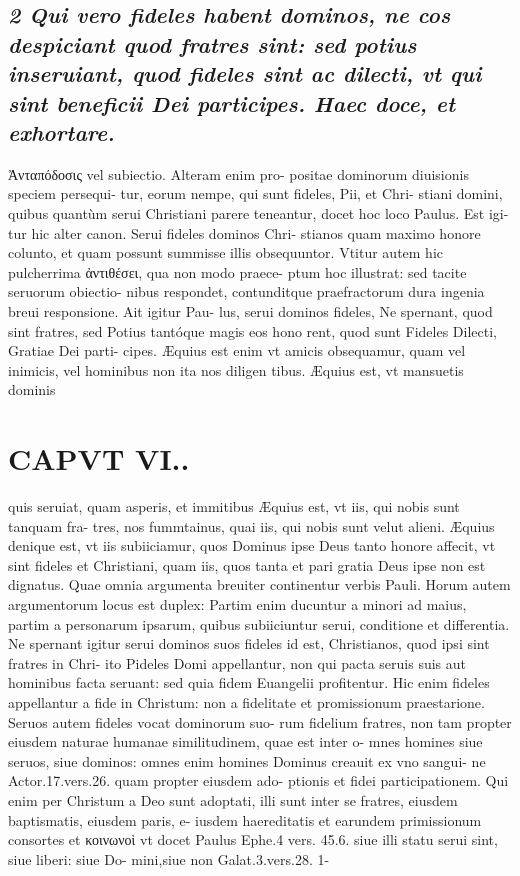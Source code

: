 \documentclass{article}
\begin{document}
\begin{pages}
\subsection*{\textit{2 Qui vero fideles habent dominos, ne cos despiciant quod fratres sint: sed potius inseruiant, quod fideles sint ac dilecti, vt qui sint beneficii Dei participes. Haec doce, et exhortare. }}\pstart Ἀνταπόδοσις vel subiectio. Alteram enim pro- positae dominorum diuisionis speciem persequi- tur, eorum nempe, qui sunt fideles, Pii, et Chri- stiani domini, quibus quantùm serui Christiani parere teneantur, docet hoc loco Paulus. Est igi- tur hic alter canon. Serui fideles dominos Chri- stianos quam maximo honore colunto, et quam possunt summisse illis obsequuntor. Vtitur autem hic pulcherrima ἀντιθέσει, qua non modo praece- ptum hoc illustrat: sed tacite seruorum obiectio- nibus respondet, contunditque praefractorum dura ingenia breui responsione. Ait igitur Pau- lus, serui dominos fideles, Ne spernant, quod sint fratres, sed Potius tantóque magis eos hono rent, quod sunt Fideles Dilecti, Gratiae Dei parti- cipes. Æquius est enim vt amicis obsequamur, quam vel inimicis, vel hominibus non ita nos diligen tibus. Æquius est, vt mansuetis dominis  \pend
\section*{CAPVT  VI.. }
\marginpar{[ p.419 ]}\pstart quis seruiat, quam asperis, et immitibus  \pend\pstart Æquius est, vt iis, qui nobis sunt tanquam fra- tres, nos fummtainus, quai iis, qui nobis sunt velut alieni.  \pend\pstart Æquius denique est, vt iis subiiciamur, quos Dominus ipse Deus tanto honore affecit, vt sint fideles et Christiani, quam iis, quos tanta et pari gratia Deus ipse non est dignatus. Quae omnia argumenta breuiter continentur verbis Pauli. Horum autem argumentorum locus est duplex: Partim enim ducuntur a minori ad maius, partim a personarum ipsarum, quibus subiiciuntur serui, conditione et differentia.  \pend\pstart Ne spernant igitur serui dominos suos fideles id est, Christianos, quod ipsi sint fratres in Chri- ito Pideles Domi appellantur, non qui pacta seruis suis aut hominibus facta seruant: sed quia fidem Euangelii profitentur. Hic enim fideles appellantur a fide in Christum: non a fidelitate et promissionum praestarione.  \pend\pstart Seruos autem fideles vocat dominorum suo- rum fidelium fratres, non tam propter eiusdem naturae humanae similitudinem, quae est inter o- mnes homines siue seruos, siue dominos: omnes enim homines Dominus creauit ex vno sangui- ne Actor.17.vers.26. quam propter eiusdem ado- ptionis et fidei participationem. Qui enim per Christum a Deo sunt adoptati, illi sunt inter se fratres, eiusdem baptismatis, eiusdem paris, e- iusdem haereditatis et earundem primissionum consortes et κοινωνοὶ vt docet Paulus Ephe.4 vers. 45.6. siue illi statu serui sint, siue liberi: siue Do- mini,siue non Galat.3.vers.28. 1-  \pend

\end{pages}
\end{document}
